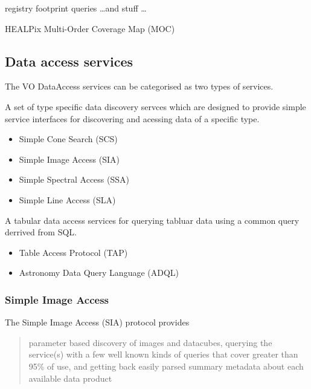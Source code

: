 \documentclass{article}
\begin{document}
registry footprint queries \ldots and stuff \ldots

HEALPix Multi-Order Coverage Map (MOC)

\subsection{Data access services}

The VO DataAccess services can be categorised as two types of services.

A set of type specific data discovery servces which are designed to provide
simple service interfaces for discovering and acessing data of a specific type.

\begin{itemize}
  \item Simple Cone Search (SCS)
  \item Simple Image Access (SIA)
  \item Simple Spectral Access (SSA)
  \item Simple Line Access (SLA)
\end{itemize}

A tabular data access services for querying tabluar data using a common query
derrived from SQL.

\begin{itemize}
  \item Table Access Protocol (TAP)
  \item Astronomy Data Query Language (ADQL)
\end{itemize}

\subsubsection{Simple Image Access}

The Simple Image Access (SIA) protocol provides 
\begin{quote}
parameter based discovery of images and datacubes, querying the service(s) with
a few well known kinds of queries that cover greater than 95\% of use, and
getting back easily parsed summary metadata about each available data product
\end{quote}
\end{document}

